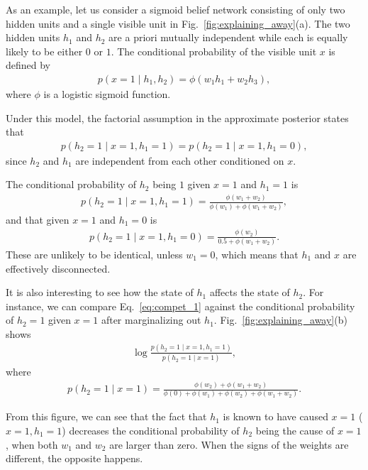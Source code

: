 \documentclass[dissertation,nocontribution]{aaltoseries}
\begin{document}
As an example, let us consider a sigmoid belief network
consisting of only two hidden units and a single visible
unit in Fig.~\ref{fig:explaining_away}(a). The two hidden
units $h_1$ and $h_2$ are a priori mutually independent
while each is equally likely to be either $0$ or $1$. The
conditional probability of the visible unit $x$ is defined
by 
\begin{align*}
    p(x = 1 \mid h_1, h_2) = \phi(w_1 h_1 + w_2 h_3),
\end{align*}
where $\phi$ is a logistic sigmoid function.

Under this model, the factorial assumption in the
approximate posterior states that 
\begin{align}
    \label{eq:cond_ind}
    p(h_2 = 1 \mid x = 1, h_1 = 1) = p(h_2 = 1 \mid x = 1,
    h_1 = 0),
\end{align}
since $h_2$ and $h_1$ are independent from each other
conditioned on $x$. 

The conditional probability of $h_2$ being $1$ given $x=1$
and $h_1=1$ is 
\begin{align}
    \label{eq:compet_1}
    p(h_2 = 1 \mid x=1, h_1=1) = \frac{\phi(w_1 +
    w_2)}{\phi(w_1) + \phi(w_1 + w_2)},
\end{align}
and that given $x=1$ and $h_1=0$ is
\begin{align}
    \label{eq:compet_2}
    p(h_2 = 1 \mid x = 1, h_1 =0) = \frac{\phi(w_2)}{0.5 +
    \phi(w_1 + w_2)}.
\end{align}
These are unlikely to be identical, unless $w_1=0$, which
means that $h_1$ and $x$ are effectively disconnected. 

It is also interesting to see how the state of $h_1$ affects
the state of $h_2$. For instance, we can compare
Eq.~\eqref{eq:compet_1} against the conditional probability
of $h_2=1$ given $x=1$ after marginalizing out $h_1$.
Fig.~\ref{fig:explaining_away}(b) shows 
\begin{align*}
    \log\frac{p(h_2 = 1 \mid x=1, h_1 = 1)}{p(h_2=1 \mid
    x=1)},
\end{align*}
where
\begin{align*}
    p(h_2 = 1 \mid x = 1) = \frac{\phi(w_2) +
    \phi(w_1+w_2)}{\phi(0) + \phi(w_1) + \phi(w_2) +
    \phi(w_1+w_2)}.
\end{align*}

From this figure, we can see that the fact that $h_1$ is
known to have caused $x=1$ ($x=1,h_1=1$) decreases the
conditional probability of $h_2$ being the cause of $x=1$,
when both $w_1$ and $w_2$ are larger than zero. When the
signs of the weights are different, the opposite happens.
\end{document}
